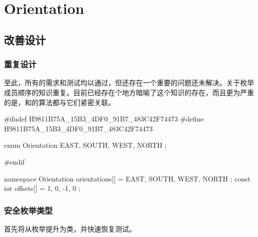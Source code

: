 \begin{savequote}[45mm]  
\end{savequote}

\chapter{Orientation} 
\label{ch:orientation}

\section{改善设计}

\begin{content}

\subsection{重复设计}

至此，所有的需求和测试均以通过，但还存在一个重要的问题还未解决。关于枚举成员顺序的知识重复。目前已经存在个地方暗喻了这个知识的存在，而且更为严重的是，和的算法都与它们紧密关联。

\begin{leftbar}
\begin{c++}[caption={include/robot-cleaner/Orientation.h}]
#ifndef H9811B75A_15B3_4DF0_91B7_483C42F74473
#define H9811B75A_15B3_4DF0_91B7_483C42F74473

enum Orientation { EAST, SOUTH, WEST, NORTH };

#endif
\end{c++}
\end{leftbar}

\begin{leftbar}
\begin{c++}[caption={src/robot-cleaner/Position.cpp}]
namespace
{
    Orientation orientations[] = { EAST, SOUTH, WEST, NORTH };
    const int offsets[] = { 1, 0, -1, 0 };
}
\end{c++}
\end{leftbar}

\subsection{安全枚举类型}

首先将从枚举提升为类，并快速恢复测试。


\end{content}
